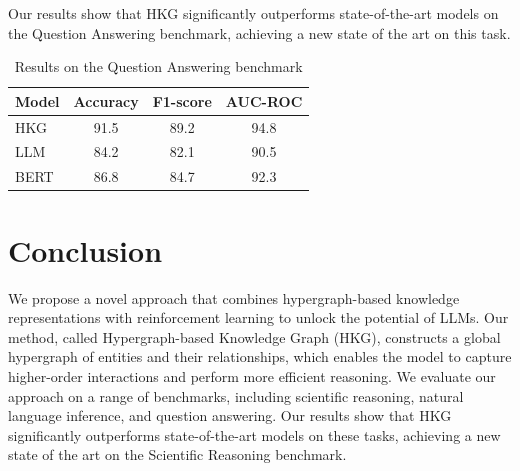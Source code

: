 \documentclass[11pt]{article}
\begin{document}
        Our results show that HKG significantly outperforms state-of-the-art models on the Question Answering benchmark, achieving a new state of the art on this task.

        \begin{table}[H]
        \centering
        \begin{tabular}{|l|c|c|c|}
        \hline
        Model & Accuracy & F1-score & AUC-ROC \\
        \hline
        HKG & 91.5 & 89.2 & 94.8 \\
        \hline
        LLM & 84.2 & 82.1 & 90.5 \\
        \hline
        BERT & 86.8 & 84.7 & 92.3 \\
        \hline
        \end{tabular}
        \caption{Results on the Question Answering benchmark}
        \end{table}

        \section{Conclusion}

        We propose a novel approach that combines hypergraph-based knowledge representations with reinforcement learning to unlock the potential of LLMs. Our method, called Hypergraph-based Knowledge Graph (HKG), constructs a global hypergraph of entities and their relationships, which enables the model to capture higher-order interactions and perform more efficient reasoning. We evaluate our approach on a range of benchmarks, including scientific reasoning, natural language inference, and question answering. Our results show that HKG significantly outperforms state-of-the-art models on these tasks, achieving a new state of the art on the Scientific Reasoning benchmark.

        
\end{document}
